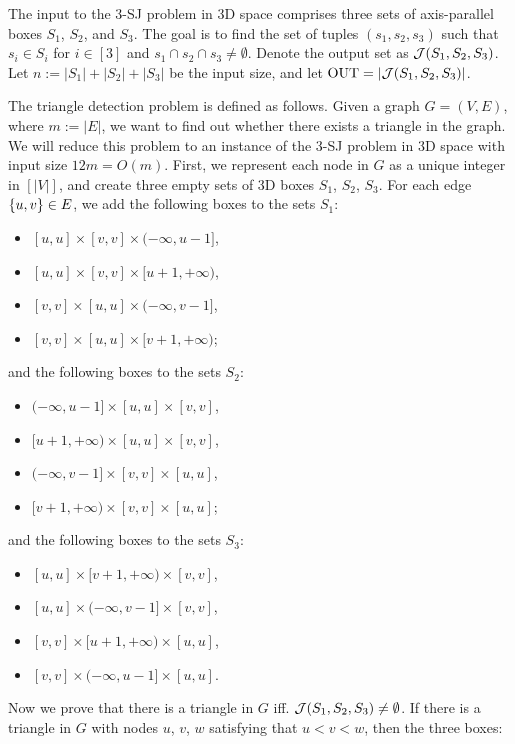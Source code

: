 The input to the 3-SJ problem in 3D space comprises
 three sets of axis-parallel boxes $S_1$, $S_2$, and $S_3$. 
The goal is to find the set of tuples $(s_1,s_2,s_3)$ such that $s_i \in S_i$ for $i \in [3]$ and $s_1 \cap s_2 \cap s_3 \neq \emptyset$. Denote the output set as $\mathcal{J}(S_1,S_2,S_3)$.
Let $n:=|S_1|+|S_2|+|S_3|$ be the input size, and let $\mathrm{OUT} = |\mathcal{J}(S_1,S_2,S_3)|$.

The triangle detection problem is defined as follows. Given a graph $G = (V,E)$, where $m:=|E|$, we want to find out whether there exists a triangle in the graph. We will reduce this problem to an instance of the 3-SJ problem in 3D space with input size $12m=O(m)$. First, we represent each node in $G$ as a unique integer in $[|V|]$, and create three empty sets of 3D boxes $S_1$, $S_2$, $S_3$. For each edge $\{u,v\}\in E$, we add the following boxes to the sets $S_1$:
\begin{itemize}
    \item $[u,u]\times [v,v]\times(-\infty,u-1]$,
    \item $[u,u]\times [v,v]\times[u+1,+\infty)$,
    \item $[v,v]\times [u,u] \times (-\infty,v-1]$,
    \item $[v,v]\times [u,u] \times [v+1,+\infty)$;
\end{itemize}
and the following boxes to the sets $S_2$:
\begin{itemize}
    \item $(-\infty,u-1]\times[u,u]\times [v,v]$,
    \item $[u+1,+\infty)\times[u,u]\times [v,v]$,
    \item $(-\infty,v-1] \times[v,v]\times [u,u]$,
    \item $ [v+1,+\infty)\times [v,v]\times [u,u]$;
\end{itemize}
and the following boxes to the sets $S_3$:
\begin{itemize}
    \item $[u,u]\times[v+1,+\infty)\times [v,v]$,
    \item $[u,u]\times(-\infty,v-1]\times [v,v]$,
    \item $[v,v]\times[u+1,+\infty)\times [u,u]$,
    \item $[v,v]\times(-\infty,u-1]\times [u,u]$.
\end{itemize}
Now we prove that there is a triangle in $G$ iff.
 $\mathcal{J}(S_1,S_2,S_3) \neq \emptyset$. If there is a triangle in $G$ with nodes $u$, $v$, $w$ satisfying that $u < v < w$, then the three boxes:
